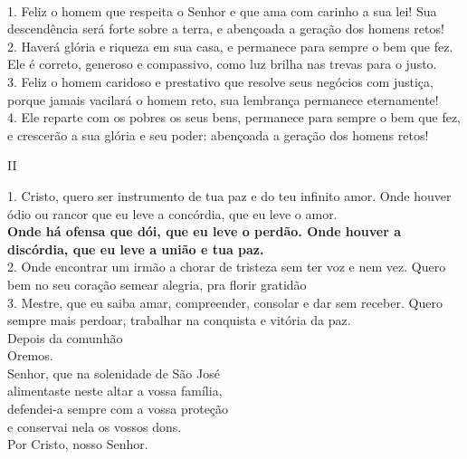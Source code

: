 \documentclass{book}
\begin{document}
\begin{flushleft}
    \vspace{.2cm} \\
    1. Feliz o homem que respeita o Senhor e que ama com carinho a sua lei! Sua descendência será forte sobre a terra, e abençoada a geração dos homens retos! \\
    2. Haverá glória e riqueza em sua casa, e permanece para sempre o bem que fez. Ele é correto, generoso e compassivo, como luz brilha nas trevas para o justo. \\
    3. Feliz o homem caridoso e prestativo que resolve seus negócios com justiça, porque jamais vacilará o homem reto, sua lembrança permanece eternamente! \\
    4. Ele reparte com os pobres os seus bens, permanece para sempre o bem que fez, e crescerão a sua glória e seu poder: abençoada a geração dos homens retos!
    \vspace{.2cm} \\
    \begin{center}
        II
    \end{center}
    1. Cristo, quero ser instrumento de tua paz e do teu infinito amor. Onde houver ódio ou rancor que eu leve a concórdia, que eu leve o amor.
    \vspace{.2cm} \\
    \textbf{Onde há ofensa que dói, que eu leve o perdão. Onde houver a discórdia, que eu leve a união e tua paz.}
    \vspace{.2cm} \\
    2. Onde encontrar um irmão a chorar de tristeza sem ter voz e nem vez. Quero bem no seu coração semear alegria, pra florir gratidão \\
    3. Mestre, que eu saiba amar, compreender, consolar e dar sem receber. Quero sempre mais perdoar, trabalhar na conquista e vitória da paz.
    \vspace{.2cm} \\
    \textcolor{VioletRed2}{Depois da comunhão}
    \vspace{.2cm} \\
    Oremos.
    \vspace{.2cm} \\
    Senhor, que na solenidade de São José \\
    alimentaste neste altar a vossa família, \\
    defendei-a sempre com a vossa proteção \\
    e conservai nela os vossos dons. \\
    Por Cristo, nosso Senhor.

\end{flushleft}
\end{document}
